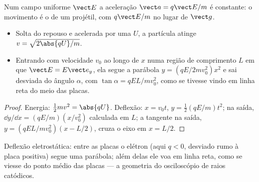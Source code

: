 \begin{proposition}\label{prop:b1:charged-particles:efield}
Num campo uniforme $\vect E$ a aceleração $\vect a = q\vect E/m$ é
constante: o movimento é o de um projétil, com $q\vect E/m$ no lugar
de $\vect g$.
\begin{itemize}
  \item Solta do repouso e acelerada por uma  $U$, a
        partícula atinge $v = \sqrt{2\abs{qU}/m}$.
  \item Entrando com velocidade $v_0$ ao longo de $x$ numa região de comprimento $L$ em que
        $\vect E = E\vect e_y$, ela segue a parábola $y = (qE/2mv_0^2)x^2$
        e sai desviada do ângulo $\alpha$, com $\tan\alpha =
        qEL/mv_0^2$, como se tivesse vindo em linha reta do
        meio das placas.
\end{itemize}
\end{proposition}

\begin{proof}
Energia: $\tfrac12 mv^2 = \abs{qU}$. Deflexão: $x = v_0t$, $y =
\tfrac12(qE/m)t^2$; na saída, $\dd y/\dd x = (qE/m)(x/v_0^2)$ calculada
em $L$; a tangente na saída, $y = (qEL/mv_0^2)(x - L/2)$, cruza o
eixo em $x = L/2$.
\end{proof}

\begin{omfigure}

{\small Deflexão eletrostática: entre as placas o elétron (aqui
$q < 0$, desviado rumo à placa positiva) segue uma parábola; além
delas ele voa em linha reta, como se viesse do ponto médio das placas
--- a geometria do osciloscópio de raios catódicos.}
\end{omfigure}

